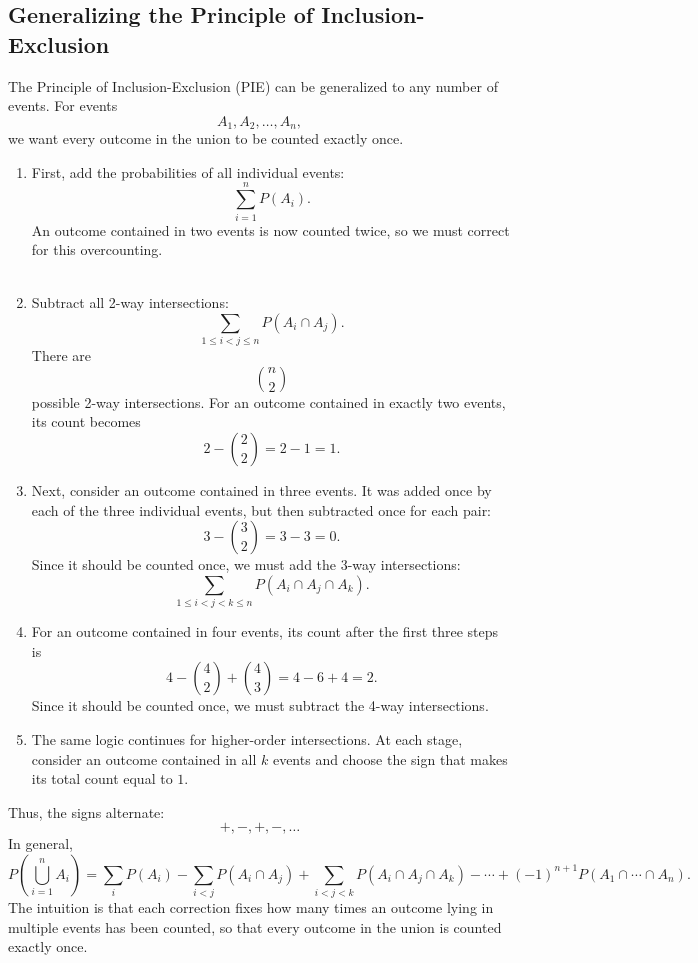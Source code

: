 ﻿\documentclass[12pt]{article}
\begin{document}
\subsection*{Generalizing the Principle of Inclusion-Exclusion}
The Principle of Inclusion-Exclusion (PIE) can be generalized to any number of events. For events
\[
A_1,A_2,\ldots,A_n,
\]
we want every outcome in the union to be counted exactly once.
\begin{enumerate}
    \item First, add the probabilities of all individual events:
    \[
    \sum_{i=1}^{n} P(A_i).
    \]
    An outcome contained in two events is now counted twice, so we must correct for this overcounting.\\\\
    \item Subtract all 2-way intersections:
    \[
    \sum_{1\leq i<j\leq n} P(A_i\cap A_j).
    \]
    There are
    \[
    \binom{n}{2}
    \]
    possible 2-way intersections. For an outcome contained in exactly two events, its count becomes
    \[
    2-\binom{2}{2}=2-1=1.
    \]
    \item Next, consider an outcome contained in three events. It was added once by each of the three individual events, but then subtracted once for each pair:
    \[
    3-\binom{3}{2}=3-3=0.
    \]
    Since it should be counted once, we must add the 3-way intersections:
    \[
    \sum_{1\leq i<j<k\leq n}
    P(A_i\cap A_j\cap A_k).
    \]
    \item For an outcome contained in four events, its count after the first three steps is
    \[
    4-\binom{4}{2}+\binom{4}{3}
    =4-6+4=2.
    \]
    Since it should be counted once, we must subtract the 4-way intersections.
    \item The same logic continues for higher-order intersections. At each stage, consider an outcome contained in all \(k\) events and choose the sign that makes its total count equal to \(1\).
\end{enumerate}
Thus, the signs alternate:
\[
+,-,+,-,\ldots
\]
In general,
\[
P\left(\bigcup_{i=1}^{n} A_i\right)
=
\sum_i P(A_i)
-\sum_{i<j}P(A_i\cap A_j)
+\sum_{i<j<k}P(A_i\cap A_j\cap A_k)
-\cdots
+(-1)^{n+1}P(A_1\cap\cdots\cap A_n).
\]
The intuition is that each correction fixes how many times an outcome lying in multiple events has been counted, so that every outcome in the union is counted exactly once.

\subsection*{}
\end{document}
